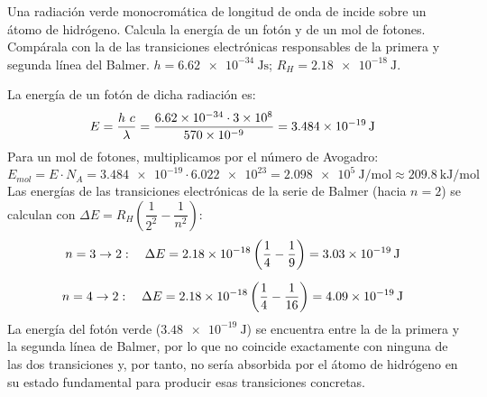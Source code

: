 \begin{exercise}
    Una radiación verde monocromática de longitud de onda de  incide sobre un átomo de hidrógeno. Calcula la energía de un fotón y de un mol de fotones. Compárala con la de las transiciones electrónicas responsables de la primera y segunda línea del Balmer. \datos{} \(h = \SI{6.62e-34}{\joule\s}\); \(R_H = \SI{2.18e-18}{\joule}\).
    \begin{solu}
        La energía de un fotón de dicha radiación es:
        \begin{equation*}
            E = \dfrac{h\ c}{\lambda} = \dfrac{\num{6.62e-34}\cdot \num{3e8}}{\num{570e-9}} = \energia[j]{3.484e-19}
        \end{equation*}
        Para un mol de fotones, multiplicamos por el número de Avogadro:
        \begin{equation*}
            E_{mol} = E\cdot N_A = \num{3.484e-19}\cdot \num{6.022e23} = \SI{2.098e5}{\joule\per\mole} \approx \SI{209.8}{\kilo\joule\per\mole}
        \end{equation*}
        Las energías de las transiciones electrónicas de la serie de Balmer (hacia \(n=2\)) se calculan con \(\Delta E = R_H\left(\dfrac{1}{2^2}-\dfrac{1}{n^2}\right)\):
        \begin{gather*}
            n=3\rightarrow 2:\quad \Delta E = \num{2.18e-18}\left(\dfrac{1}{4}-\dfrac{1}{9}\right) = \energia[j]{3.03e-19}\separ
            n=4\rightarrow 2:\quad \Delta E = \num{2.18e-18}\left(\dfrac{1}{4}-\dfrac{1}{16}\right) = \energia[j]{4.09e-19}
        \end{gather*}
        La energía del fotón verde (\(\SI{3.48e-19}{\joule}\)) se encuentra entre la de la primera y la segunda línea de Balmer, por lo que no coincide exactamente con ninguna de las dos transiciones y, por tanto, no sería absorbida por el átomo de hidrógeno en su estado fundamental para producir esas transiciones concretas.
    \end{solu}
\end{exercise}

